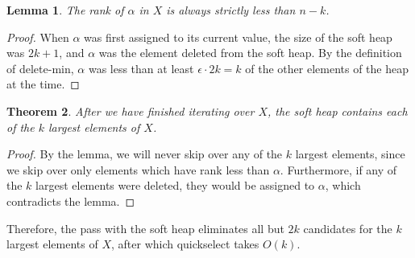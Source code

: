 \documentclass[11pt]{article}
\newtheorem{lemma}{Lemma}
\newtheorem{theorem}[lemma]{Theorem}
\begin{document}
\begin{lemma}
The rank of $\alpha$ in $X$ is always strictly less than $n-k$.
\end{lemma}
\begin{proof}
When $\alpha$ was first assigned to its current value, the size of the soft heap was $2k+1$, and $\alpha$ was the element deleted from the soft heap.  By the definition of delete-min, $\alpha$ was less than at least $\epsilon \cdot 2k = k$ of the other elements of the heap at the time.
\end{proof}
\begin{theorem}
After we have finished iterating over $X$, the soft heap contains each of the $k$ largest elements of $X$.
\end{theorem}
\begin{proof}
By the lemma, we will never skip over any of the $k$ largest elements, since we skip over only elements which have rank less than $\alpha$.  Furthermore, if any of the $k$ largest elements were deleted, they would be assigned to $\alpha$, which contradicts the lemma.
\end{proof}

Therefore, the pass with the soft heap eliminates all but $2k$ candidates for the $k$ largest elements of $X$, after which quickselect takes $O(k)$.


\end{document}
